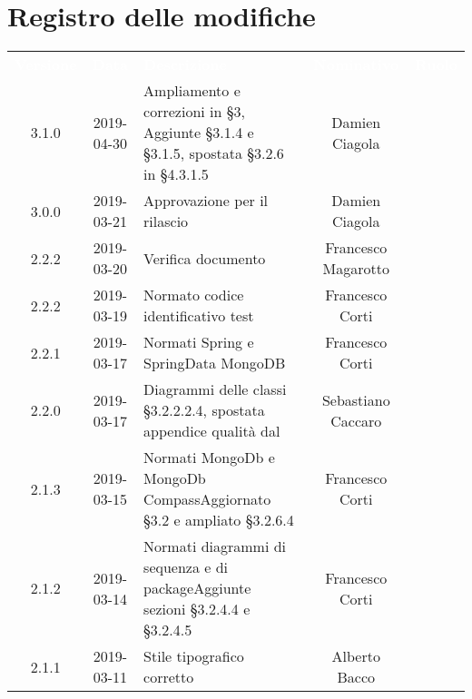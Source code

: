 
\section*{Registro delle modifiche}
{
	\renewcommand{\arraystretch}{1.5}
	\centering
	\begin{longtable}{ c c C{4cm} c c }
		
		\textcolor{white}{\textbf{Versione}} & \textcolor{white}{\textbf{Data}} & \textcolor{white}{\textbf{Descrizione}} & \textcolor{white}{\textbf{Nominativo}} & \textcolor{white}{\textbf{Ruolo}}\\
		
		3.1.0 & 2019-04-30 & Ampliamento e correzioni in §3, Aggiunte §3.1.4 e §3.1.5, spostata §3.2.6 in §4.3.1.5 & Damien Ciagola & \reda{} \\
		
	3.0.0 & 2019-03-21 & Approvazione per il rilascio & Damien Ciagola & \Res{} \\
			
	2.2.2 & 2019-03-20 & 
	Verifica documento & Francesco Magarotto & \ver{} \\	
		
		2.2.2 & 2019-03-19 & Normato codice identificativo test & Francesco Corti & \reda{} \\
		
		2.2.1 & 2019-03-17 & Normati Spring e SpringData MongoDB & Francesco Corti & \reda{} \\		
		
		2.2.0 & 2019-03-17 & Diagrammi delle classi §3.2.2.2.4, spostata appendice qualità dal \PdQ & Sebastiano Caccaro & \reda{} \\		
		
		2.1.3 & 2019-03-15 & Normati MongoDb e MongoDb Compass\newline Aggiornato §3.2 e ampliato §3.2.6.4 & Francesco Corti & \reda{} \\		
		
		2.1.2 & 2019-03-14 & Normati diagrammi di sequenza e di package\newline Aggiunte sezioni §3.2.4.4 e §3.2.4.5 & Francesco Corti & \reda{} \\	
		
		2.1.1 & 2019-03-11 & Stile tipografico corretto & Alberto Bacco & \reda{} \\	
		

\end{longtable}}
